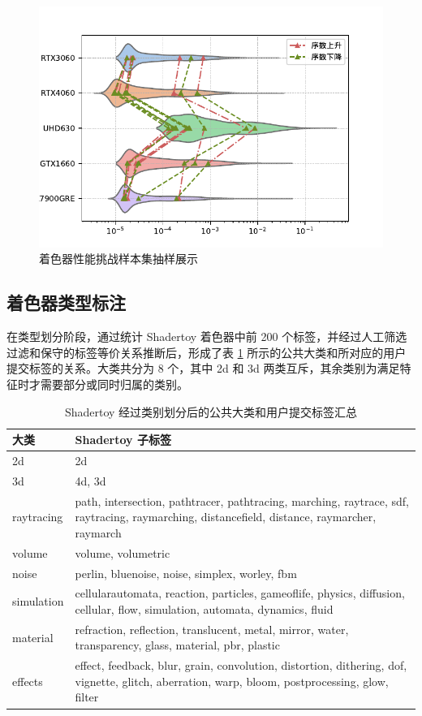 \begin{figure}[h]
    \centering
    \includegraphics[width=0.8\linewidth]{figures/difficult.pdf}
    \caption{着色器性能挑战样本集抽样展示}
    \label{fig:difficultSamples_ch3}
\end{figure}

\subsection{{\added 着色器类型标注}}

{\added 在类型划分阶段，通过统计 Shadertoy 着色器中前 200 个标签，并经过人工筛选过滤和保守的标签等价关系推断后，形成了表 \ref{table:tag_classification} 所示的公共大类和所对应的用户提交标签的关系。大类共分为 8 个，其中 2d 和 3d 两类互斥，其余类别为满足特征时才需要部分或同时归属的类别。}

\begin{table}[h]
    \centering
    \caption{Shadertoy 经过类别划分后的公共大类和用户提交标签汇总}
    \label{table:tag_classification}
    \begin{tabular}{p{2cm}|p{11cm}}
        \toprule
        大类 & Shadertoy 子标签 \\
        \midrule
        2d & 2d \\
        3d & 4d, 3d \\
        raytracing & path, intersection, pathtracer, pathtracing, marching, raytrace, sdf, raytracing, raymarching, distancefield, distance, raymarcher, raymarch \\
        volume & volume, volumetric \\
        noise & perlin, bluenoise, noise, simplex, worley, fbm \\
        simulation & cellularautomata, reaction, particles, gameoflife, physics, diffusion, cellular, flow, simulation, automata, dynamics, fluid \\
        material & refraction, reflection, translucent, metal, mirror, water, transparency, glass, material, pbr, plastic \\
        effects & effect, feedback, blur, grain, convolution, distortion, dithering, dof, vignette, glitch, aberration, warp, bloom, postprocessing, glow, filter \\
        \bottomrule
    \end{tabular}
\end{table}

